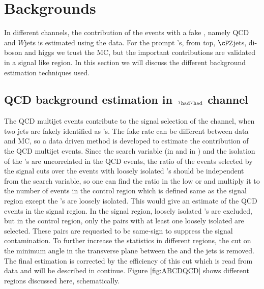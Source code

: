 \section{Backgrounds}
\label{sect:bkgLepTau}
In different channels, the contribution of the events with a fake \Tau, namely QCD and $W$jets is estimated using the data. 
For the prompt \Tau's, from top, $\cPZ$jets, di-boson and higgs we trust 
the MC, but the important contributions are validated in a signal like region. 
In this section we will discuss the different background estimation techniques used.

\subsection{\texorpdfstring{QCD background estimation in $\,\tau_{\rm had}\tau_{\rm had}$ channel}{QCD background estimation in tau-tau channel}}
The QCD multijet events contribute to the signal selection of the \tauTau channel, when two jets are 
fakely identified as \Tau's. The fake rate can be different between data and MC, so a data driven method is developed to estimate the 
contribution of the QCD multijet events. 
Since the search variable (\mttwo in \binone and \SumMT in \bintwo) and the 
isolation of the \Tau's are uncorrelated in the QCD events, the ratio of the events selected by the signal cuts over the events 
with loosely isolated \Tau's should be independent from the search variable, so one can find the ratio in the low \mttwo or \SumMT and 
multiply it to the number of events in the control region which is defined same as the signal region except the \Tau's are loosely isolated. 
This would give an estimate of the QCD events in the signal region. In the signal region, loosely isolated  \Tau's 
are excluded, but in the control region, only the pairs with at least one loosely isolated \Tau are selected. 
These pairs are requested to be same-sign to suppress the signal contamination. To further increase the statistics 
in different regions, the cut on the minimum angle in the transverse plane between the \MET and the jets is removed. The final estimation
is corrected by the efficiency of this cut which is read from data and will be described in continue.
Figure \ref{fig:ABCDQCD} shows different regions discussed here, schematically.
